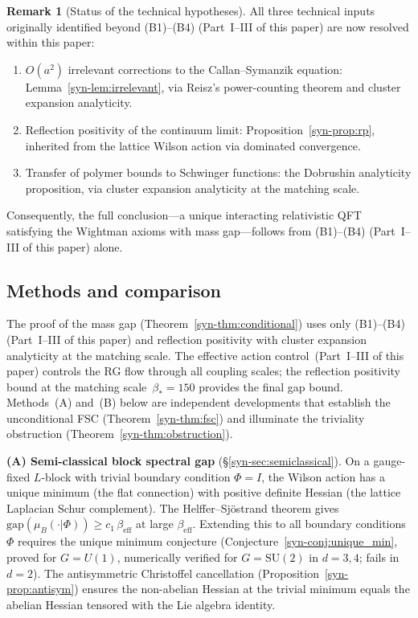 \documentclass[11pt]{article}
\theoremstyle{definition}
\newtheorem{remark}[theorem]{Remark}
\newcommand{\SU}{\mathrm{SU}}
\newcommand{\gap}{\mathrm{gap}}
\begin{document}
\begin{remark}[Status of the technical hypotheses]
All three technical inputs originally identified beyond
(B1)--(B4) (Part~I--III of this paper) are now resolved within this paper:
\begin{enumerate}[label=\textup{(H\arabic*)},nosep]
  \item $O(a^2)$ irrelevant corrections to the
    Callan--Symanzik equation: Lemma~\ref{syn-lem:irrelevant},
    via Reisz's power-counting theorem and cluster expansion
    analyticity.
  \item Reflection positivity of the continuum limit:
    Proposition~\ref{syn-prop:rp}, inherited from the
    lattice Wilson action via dominated convergence.
  \item Transfer of polymer bounds to Schwinger functions:
    the Dobrushin analyticity proposition, via cluster expansion
    analyticity at the matching scale.
\end{enumerate}
Consequently, the full conclusion---a unique interacting
relativistic QFT satisfying
the Wightman axioms with mass gap---follows from
(B1)--(B4) (Part~I--III of this paper) alone.
\end{remark}

\subsection{Methods and comparison}

\noindent The proof of the mass gap
(Theorem~\ref{syn-thm:conditional}) uses only (B1)--(B4) (Part~I--III of this paper)
and reflection positivity with cluster expansion analyticity
at the matching scale.  The effective action
control~(Part~I--III of this paper)
controls the RG flow through all coupling scales; the reflection
positivity bound at the matching scale~$\beta_* = 150$ provides
the final gap bound.  Methods~(A) and~(B) below are independent
developments that establish the unconditional FSC
(Theorem~\ref{syn-thm:fsc}) and illuminate the triviality
obstruction (Theorem~\ref{syn-thm:obstruction}).

\smallskip
\noindent\textbf{(A) Semi-classical block spectral gap}
(\S\ref{syn-sec:semiclassical}).
On a gauge-fixed $L$-block with trivial boundary condition
$\Phi = I$, the Wilson action has a unique
minimum (the flat connection) with positive definite Hessian
(the lattice Laplacian Schur complement).
The Helffer--Sj\"ostrand theorem gives
$\gap(\mu_B(\cdot|\Phi)) \geq c_1\,\beta_{\mathrm{eff}}$
at large $\beta_{\mathrm{eff}}$.
Extending this to all boundary conditions~$\Phi$ requires the
unique minimum conjecture (Conjecture~\ref{syn-conj:unique_min},
proved for $G = U(1)$, numerically verified for
$G = \SU(2)$ in $d = 3, 4$; fails in $d = 2$).
The antisymmetric Christoffel cancellation
(Proposition~\ref{syn-prop:antisym})
ensures the non-abelian Hessian at the trivial minimum equals
the abelian Hessian tensored with the Lie algebra identity.
\end{document}

